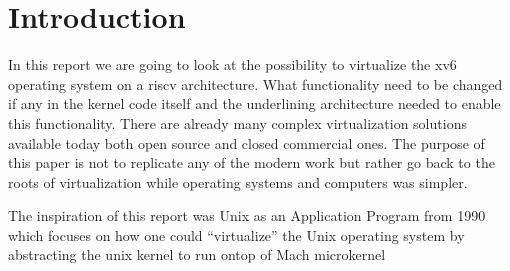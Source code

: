 \section{Introduction}

In this report we are going to look at the possibility to virtualize the xv6 \cite{xv6} operating system on a riscv architecture. What functionality need to be changed if any in the kernel code itself and the underlining architecture needed to enable this functionality. There are already many complex virtualization solutions available today both open source and closed commercial ones. The purpose of this paper is not to replicate any of the modern work but rather go back to the roots of virtualization while operating systems and computers was simpler.

The inspiration of this report was Unix as an Application Program \cite{Golubunix} from 1990 which focuses on how one could “virtualize” the Unix operating system by abstracting the unix kernel to run ontop of Mach microkernel